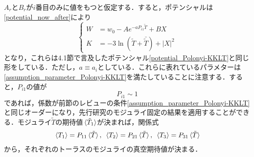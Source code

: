 \documentclass[a4paper,uplatex,dvipdfmx]{jsarticle}
\theoremstyle{definition}
\begin{document}
$A_{r}$と$B_{r}$が$i$番目のみに値をもつと仮定する．すると，ポテンシャルは\eqref{potential_now_after}により
\begin{equation}
   \left\{
      \begin{alignedat}{1}
         W
         &=w_{0}
         -
         A
         e^{-aP_{i1}\tilde{T}}
         +
         B
         X
         \\
         K
         &=
         -
         3\ln(\tilde{T}+\bar{\tilde{T}})
         +
         |X|^2
      \end{alignedat}
   \right.
   \nonumber
\end{equation}
となり，これらは4.1節で言及したポテンシャル\eqref{potential_Polonyi-KKLT}と同じ形をしている．ただし，$a\equiv a_{i}$としている．これらに表れているパラメターは\eqref{assumption_parameter_Polonyi-KKLT}を満たしていることに注意する．すると，$P_{i1}$の値が
\begin{equation}
   P_{i1}
   \sim
   1
   \label{cond_P}
\end{equation}
であれば，係数が前節のレビューの条件\eqref{assumption_parameter_Polonyi-KKLT}と同じオーダーになり，先行研究のモジュライ固定の結果を適用することができる．モジュライ$\tilde{T}$の期待値$\ev*{\tilde{T}_{1}}$が決まれば，関係式
\begin{equation}
   \ev*{T_{1}}
   =
   P_{11}\ev*{\tilde{T}}
   ,\ 
   \ev*{T_{2}}
   =
   P_{21}\ev*{\tilde{T}}
   ,\ 
   \ev*{T_{3}}
   =
   P_{31}\ev*{\tilde{T}}
   \label{relation_moduli}
\end{equation}
から，それぞれのトーラスのモジュライの真空期待値が決まる．
\end{document}
